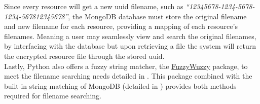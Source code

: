 Since every resource will get a new \acrshort{uuid} filename, such as \textit{``12345678-1234-5678-1234-567812345678''}, the MongoDB database must store the original filename and new filename for each resource, providing a mapping of each resource's filenames. Meaning a user may seamlessly view and search the original filenames, by interfacing with the database but upon retrieving a file the system will return the encrypted resource file through the stored \acrshort{uuid}.\\
Lastly, Python also offers a fuzzy string matcher, the \href{https://pypi.org/project/fuzzywuzzy/}{FuzzyWuzzy} package, to meet the filename searching needs detailed in . This package combined with the built-in string matching of MongoDB (detailed in ) provides both methods required for filename searching.
